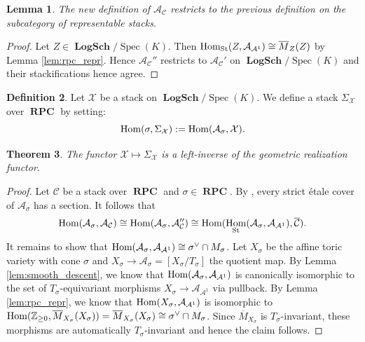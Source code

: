 \documentclass[11pt]{amsart}
\newtheorem{theorem}{Theorem}[section]
\newtheorem{lemma}[theorem]{Lemma}
\theoremstyle{definition}
\newtheorem{definition}[theorem]{Definition}
\theoremstyle{remark}
\DeclareMathOperator{\Spec}{Spec}
\DeclareMathOperator{\LogSch}{\mathbf{LogSch}}
\DeclareMathOperator{\RPC}{\mathbf{RPC}}
\DeclareMathOperator{\Hom}{\textup{Hom}}
\begin{document}
\begin{lemma}
	The new definition of $\mathcal{A}_{\mathcal{C}}$ restricts to the previous definition on the subcategory of representable stacks.
\end{lemma}

\begin{proof}
	Let $Z\in \LogSch/\Spec(K)$. Then $\Hom_{\mathrm{St}}(Z,\mathcal{A}_{\mathcal{A}^{1}})\cong \overline{M}_Z(Z)$
	by Lemma \ref{lem:rpc_repr}. Hence $\mathcal{A}_{\mathcal{C}}''$ restricts to $\mathcal{A}_{\mathcal{C}}'$ on $\LogSch/\Spec(K)$
	and their stackifications hence agree.
\end{proof}

\begin{definition}
	Let $\mathcal{X}$ be a stack on $\LogSch/\Spec(K)$. We define
	a stack $\Sigma_{\mathcal{X}}$ over $\RPC$ by setting:
	$$\Hom(\sigma,\Sigma_{\mathcal{X}}):=\Hom(\mathcal{A}_{\sigma},\mathcal{X}).$$
\end{definition}

\begin{theorem}
	\label{thm:left_inv_geom}
	The functor $\mathcal{X}\mapsto \Sigma_{\mathcal{X}}$ is a
	left-inverse of the geometric realization functor.
\end{theorem}


\begin{proof}
	Let $\mathcal{C}$ be a stack over $\RPC$ and $\sigma\in \RPC$. By \cite[Corollary 2.2.8]{Birational_inva_Abramo_2013},
	every strict étale cover of $\mathcal{A}_{\sigma}$ has a section. It follows that
	$$\Hom(\mathcal{A}_{\sigma},\mathcal{A}_{\mathcal{C}})\cong \Hom(\mathcal{A}_{\sigma},\mathcal{A}_{\mathcal{C}}'')\cong \Hom(\Hom_{\mathrm{St}}(\mathcal{A}_{\sigma},\mathcal{A}_{\mathcal{A}^{1}}),\overline{\mathcal{C}}).$$
	It remains to show that $\Hom(\mathcal{A}_{\sigma},\mathcal{A}_{\mathcal{A}^{1}})\cong \sigma^{\vee}\cap M_{\sigma}$.
	Let $X_{\sigma}$ be the affine toric variety with cone $\sigma$ and $X_{\sigma}\to \mathcal{A}_{\sigma}=[X_{\sigma}/T_{\sigma}]$
	the quotient map. By Lemma \ref{lem:smooth_descent}, we know that $\Hom(\mathcal{A}_{\sigma},\mathcal{A}_{\mathcal{A}^{1}})$
	is canonically isomorphic to the set of $T_{\sigma}$-equivariant morphisms $X_{\sigma}\to \mathcal{A}_{\mathcal{A}^{1}}$
	via pullback. By Lemma \ref{lem:rpc_repr}, we know that $\Hom(X_{\sigma},\mathcal{A}_{\mathcal{A}^{1}})$
	is isomorphic to $\Hom(\mathbb{Z}_{\ge 0}, \overline{M}_{X_{\sigma}}(X_{\sigma}))=\overline{M}_{X_{\sigma}}(X_{\sigma})\cong \sigma^{\vee}\cap M_{\sigma}$.
	Since $\overline{M}_{X_{\sigma}}$ is $T_{\sigma}$-invariant, these morphisms are automatically $T_{\sigma}$-invariant and hence
	the claim follows.
\end{proof}
\end{document}
